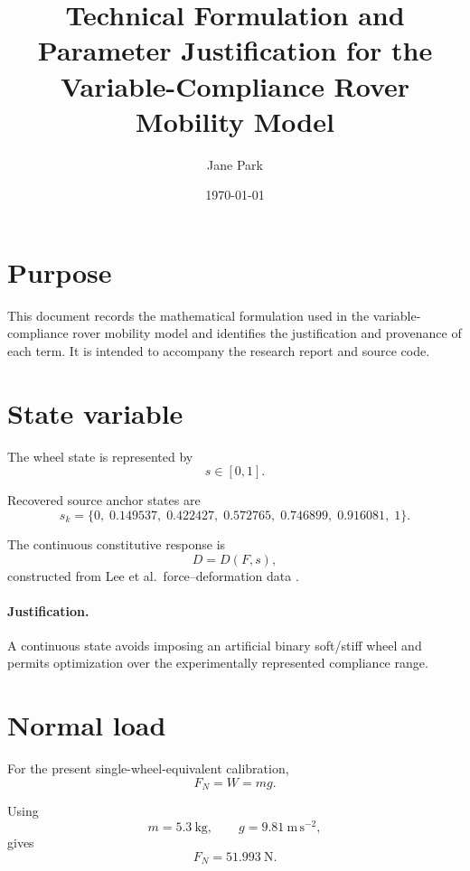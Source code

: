 \documentclass[11pt]{article}
\title{Technical Formulation and Parameter Justification for the Variable-Compliance Rover Mobility Model}
\author{Jane Park}
\date{\today}
\begin{document}
\maketitle

\section{Purpose}

This document records the mathematical formulation used in the variable-compliance rover mobility model and identifies the justification and provenance of each term. It is intended to accompany the research report and source code.

\section{State variable}

The wheel state is represented by
\begin{equation}
s\in[0,1].
\end{equation}

Recovered source anchor states are
\begin{equation}
s_k=
\{0,\;0.149537,\;0.422427,\;0.572765,\;0.746899,\;0.916081,\;1\}.
\end{equation}

The continuous constitutive response is
\begin{equation}
D=D(F,s),
\end{equation}
constructed from Lee et al.\ force--deformation data \cite{Lee2024}.

\paragraph{Justification.}
A continuous state avoids imposing an artificial binary soft/stiff wheel and permits optimization over the experimentally represented compliance range.

\section{Normal load}

For the present single-wheel-equivalent calibration,
\begin{equation}
F_N=W=mg.
\end{equation}

Using
\begin{equation}
m=5.3~\mathrm{kg},\qquad g=9.81~\mathrm{m\,s^{-2}},
\end{equation}
gives
\begin{equation}
F_N=51.993~\mathrm{N}.
\end{equation}
\end{document}

